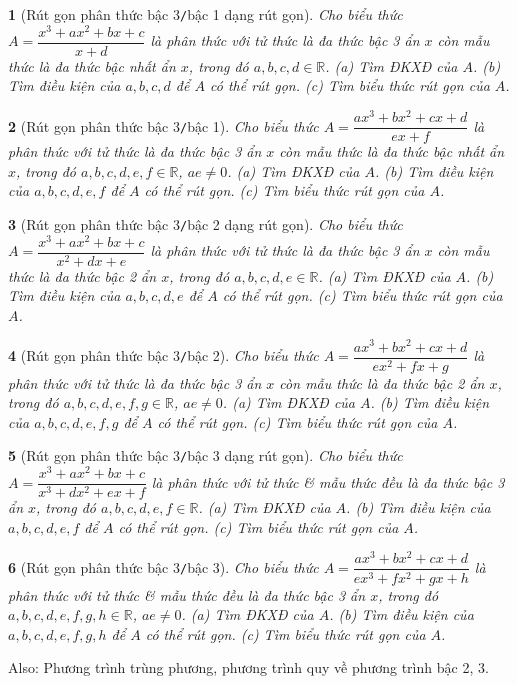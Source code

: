 \documentclass{article}
\newtheorem{baitoan}{}
\begin{document}
\begin{baitoan}[Rút gọn phân thức bậc 3{\tt/}bậc 1 dạng rút gọn]
	Cho biểu thức $A = \dfrac{x^3 + ax^2 + bx + c}{x + d}$ là phân thức với tử thức là đa thức bậc 3 ẩn $x$ còn mẫu thức là đa thức bậc nhất ẩn $x$, trong đó $a,b,c,d\in\mathbb{R}$. (a) Tìm {\rm ĐKXĐ} của $A$. (b) Tìm điều kiện của $a,b,c,d$ để $A$ có thể rút gọn. (c) Tìm biểu thức rút gọn của $A$.
\end{baitoan}

\begin{baitoan}[Rút gọn phân thức bậc 3{\tt/}bậc 1]
	Cho biểu thức $A = \dfrac{ax^3 + bx^2 + cx + d}{ex + f}$ là phân thức với tử thức là đa thức bậc 3 ẩn $x$ còn mẫu thức là đa thức bậc nhất ẩn $x$, trong đó $a,b,c,d,e,f\in\mathbb{R}$, $ae\ne0$. (a) Tìm {\rm ĐKXĐ} của $A$. (b) Tìm điều kiện của $a,b,c,d,e,f$ để $A$ có thể rút gọn. (c) Tìm biểu thức rút gọn của $A$.
\end{baitoan}

\begin{baitoan}[Rút gọn phân thức bậc 3{\tt/}bậc 2 dạng rút gọn]
	Cho biểu thức $A = \dfrac{x^3 + ax^2 + bx + c}{x^2 + dx + e}$ là phân thức với tử thức là đa thức bậc 3 ẩn $x$ còn mẫu thức là đa thức bậc 2 ẩn $x$, trong đó $a,b,c,d,e\in\mathbb{R}$. (a) Tìm {\rm ĐKXĐ} của $A$. (b) Tìm điều kiện của $a,b,c,d,e$ để $A$ có thể rút gọn. (c) Tìm biểu thức rút gọn của $A$.
\end{baitoan}

\begin{baitoan}[Rút gọn phân thức bậc 3{\tt/}bậc 2]
	Cho biểu thức $A = \dfrac{ax^3 + bx^2 + cx + d}{ex^2 + fx + g}$ là phân thức với tử thức là đa thức bậc 3 ẩn $x$ còn mẫu thức là đa thức bậc 2 ẩn $x$, trong đó $a,b,c,d,e,f,g\in\mathbb{R}$, $ae\ne0$. (a) Tìm {\rm ĐKXĐ} của $A$. (b) Tìm điều kiện của $a,b,c,d,e,f,g$ để $A$ có thể rút gọn. (c) Tìm biểu thức rút gọn của $A$.
\end{baitoan}

\begin{baitoan}[Rút gọn phân thức bậc 3{\tt/}bậc 3 dạng rút gọn]
	Cho biểu thức $A = \dfrac{x^3 + ax^2 + bx + c}{x^3 + dx^2 + ex + f}$ là phân thức với tử thức \& mẫu thức đều là đa thức bậc 3 ẩn $x$, trong đó $a,b,c,d,e,f\in\mathbb{R}$. (a) Tìm {\rm ĐKXĐ} của $A$. (b) Tìm điều kiện của $a,b,c,d,e,f$ để $A$ có thể rút gọn. (c) Tìm biểu thức rút gọn của $A$.
\end{baitoan}

\begin{baitoan}[Rút gọn phân thức bậc 3{\tt/}bậc 3]
	Cho biểu thức $A = \dfrac{ax^3 + bx^2 + cx + d}{ex^3 + fx^2 + gx + h}$ là phân thức với tử thức \& mẫu thức đều là đa thức bậc 3 ẩn $x$, trong đó $a,b,c,d,e,f,g,h\in\mathbb{R}$, $ae\ne0$. (a) Tìm {\rm ĐKXĐ} của $A$. (b) Tìm điều kiện của $a,b,c,d,e,f,g,h$ để $A$ có thể rút gọn. (c) Tìm biểu thức rút gọn của $A$.
\end{baitoan}
Also: Phương trình trùng phương, phương trình quy về phương trình bậc 2, 3.
\end{document}
